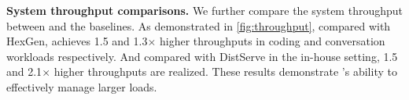 

\noindent \textbf{System throughput comparisons.} 
We further compare the system throughput between \sys and the baselines. 
As demonstrated in \autoref{fig:throughput}, compared with HexGen, \sys achieves 1.5 and 1.3$\times$ higher throughputs in coding and conversation workloads respectively. And compared with DistServe in the in-house setting, 1.5 and 2.1$\times$ higher throughputs are realized. These results demonstrate \sys's ability to effectively manage larger loads.


